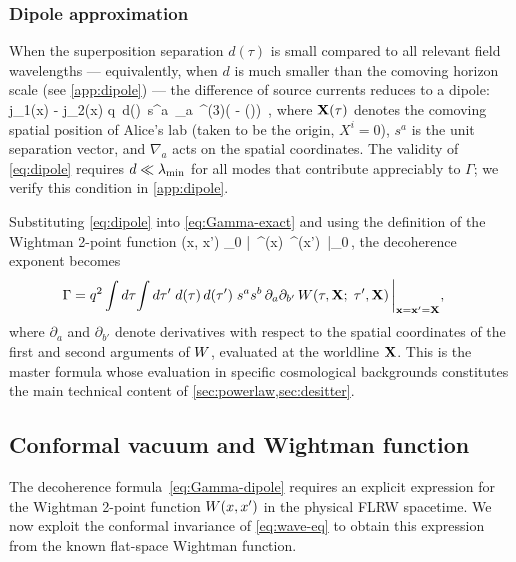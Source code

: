 \subsubsection*{Dipole approximation}

When the superposition separation $d(\tau)$ is small compared to all relevant
field wavelengths — equivalently, when $d$ is much smaller than the comoving
horizon scale (see \cref{app:dipole}) — the difference of
source currents reduces to a dipole:
\be
  j_1(x) - j_2(x)
  \approx
  q\, d(\tau)\, s^a\, \nabla_a\, \delta^{(3)}\!\lb( - (\tau)\rb) \,,
  \label{eq:dipole}
\ee
where $\mathbf{X}(\tau)$ denotes the comoving spatial position of Alice's lab (taken
to be the origin, $X^i = 0$), $s^a$ is the unit separation vector, and
$\nabla_a$ acts on the spatial coordinates.  The validity of
\cref{eq:dipole} requires $d \ll \lambda_{\rm min}$ for all modes that contribute
appreciably to $\Gamma$; we verify this condition in \cref{app:dipole}.

Substituting \cref{eq:dipole} into \cref{eq:Gamma-exact} and using the definition
of the Wightman 2-point function
\be
  \Wight(x, x')
  \equiv
  \langle \Psi_0 |\, \varphi^{\inc}(x)\, \varphi^{\inc}(x') \,|\Psi_0\rangle \,,
  \label{eq:Wight-def}
\ee
the decoherence exponent becomes
\begin{align}
  \Gamma
  &=
  q^2
  \int d\tau\!\int d\tau'\;
  d(\tau)\, d(\tau')\;
  s^a s^b\,
  \partial_a \partial_{b'}\,
  W\!\left(\tau, \mathbf{X};\; \tau', \mathbf{X}\right)
  \bigg|_{\mathbf{x} = \mathbf{x}' = \mathbf{X}} ,
  \label{eq:Gamma-dipole}
\end{align}
where $\partial_a$ and $\partial_{b'}$ denote derivatives with respect to the
spatial coordinates of the first and second arguments of $W$, evaluated at
the worldline $\mathbf{X}$.  This is the master formula whose evaluation in specific
cosmological backgrounds constitutes the main technical content of
\cref{sec:powerlaw,sec:desitter}.


\subsection{Conformal vacuum and Wightman function}
\label{sec:confvac}

The decoherence formula~\eqref{eq:Gamma-dipole} requires an explicit expression
for the Wightman 2-point function $W(x,x')$ in the physical FLRW spacetime.
We now exploit the conformal invariance of \cref{eq:wave-eq} to obtain this
expression from the known flat-space Wightman function.

